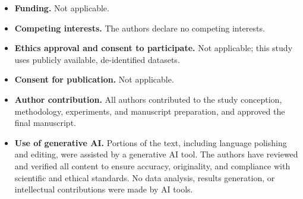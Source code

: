 \documentclass[pdflatex,sn-nature]{sn-jnl}%
\theoremstyle{thmstyleone}%
\theoremstyle{thmstyletwo}%
\theoremstyle{thmstylethree}%
\begin{document}
\begin{itemize}
\item \textbf{Funding.} Not applicable.
\item \textbf{Competing interests.} The authors declare no competing interests.
\item \textbf{Ethics approval and consent to participate.} Not applicable; this study uses publicly available, de-identified datasets.
\item \textbf{Consent for publication.} Not applicable.
\item \textbf{Author contribution.} All authors contributed to the study conception, methodology, experiments, and manuscript preparation, and approved the final manuscript.
\item \textbf{Use of generative AI.} Portions of the text, including language polishing and editing, were assisted by a generative AI tool. The authors have reviewed and verified all content to ensure accuracy, originality, and compliance with scientific and ethical standards. No data analysis, results generation, or intellectual contributions were made by AI tools.
\end{itemize}


\end{document}
